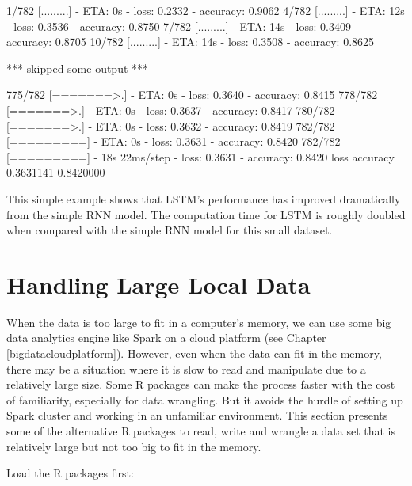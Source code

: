 \documentclass[12pt,]{krantz}
\makeatletter
\newenvironment{Shaded}{\begin{snugshade}}{\end{snugshade}}
\newcommand{\NormalTok}[1]{#1}
\newenvironment{kframe}{%
\medskip{}
\setlength{\fboxsep}{.8em}
 \def\at@end@of@kframe{}%
 \ifinner\ifhmode%
  \def\at@end@of@kframe{\end{minipage}}%
  \begin{minipage}{\columnwidth}%
 \fi\fi%
 \def\FrameCommand##1{\hskip\@totalleftmargin \hskip-\fboxsep
 \colorbox{shadecolor}{##1}\hskip-\fboxsep
     \hskip-\linewidth \hskip-\@totalleftmargin \hskip\columnwidth}%
 \MakeFramed {\advance\hsize-\width
   \@totalleftmargin\z@ \linewidth\hsize
   \@setminipage}}%
 {\par\unskip\endMakeFramed%
 \at@end@of@kframe}
\renewenvironment{Shaded}{\begin{kframe}}{\end{kframe}}
\makeatother
\begin{document}
\begin{Shaded}
\begin{Highlighting}[]
\NormalTok{  1/782 [.........] - ETA: 0s  - loss: 0.2332 - accuracy: 0.9062}
\NormalTok{  4/782 [.........] - ETA: 12s - loss: 0.3536 - accuracy: 0.8750}
\NormalTok{  7/782 [.........] - ETA: 14s - loss: 0.3409 - accuracy: 0.8705}
\NormalTok{ 10/782 [.........] - ETA: 14s - loss: 0.3508 - accuracy: 0.8625}

\NormalTok{*** skipped some output ***}

\NormalTok{775/782 [=======>.] - ETA: 0s - loss: 0.3640 - accuracy: 0.8415}
\NormalTok{778/782 [=======>.] - ETA: 0s - loss: 0.3637 - accuracy: 0.8417}
\NormalTok{780/782 [=======>.] - ETA: 0s - loss: 0.3632 - accuracy: 0.8419}
\NormalTok{782/782 [=========] - ETA: 0s - loss: 0.3631 - accuracy: 0.8420}
\NormalTok{782/782 [=========] - 18s 22ms/step - loss: 0.3631 - accuracy: 0.8420}
\NormalTok{     loss  accuracy }
\NormalTok{0.3631141 0.8420000 }
\end{Highlighting}
\end{Shaded}

This simple example shows that LSTM's performance has improved dramatically from the simple RNN model. The computation time for LSTM is roughly doubled when compared with the simple RNN model for this small dataset.

\hypertarget{appendix-appendix}{%
\appendix {}}


\hypertarget{largelocaldata}{%
\chapter{Handling Large Local Data}\label{largelocaldata}}

When the data is too large to fit in a computer's memory, we can use some big data analytics engine like Spark on a cloud platform (see Chapter \ref{bigdatacloudplatform}). However, even when the data can fit in the memory, there may be a situation where it is slow to read and manipulate due to a relatively large size. Some R packages can make the process faster with the cost of familiarity, especially for data wrangling. But it avoids the hurdle of setting up Spark cluster and working in an unfamiliar environment. This section presents some of the alternative R packages to read, write and wrangle a data set that is relatively large but not too big to fit in the memory.

Load the R packages first:
\end{document}
